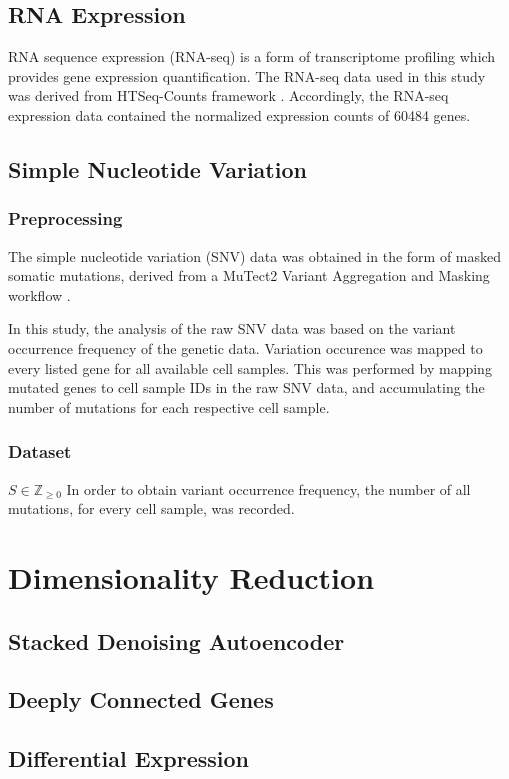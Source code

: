 \subsection{RNA Expression}

RNA sequence expression (RNA-seq) is a form of transcriptome profiling which provides gene expression quantification. The RNA-seq data used in this study was derived from HTSeq-Counts framework \cite{anders2015htseq}. Accordingly, the RNA-seq expression data contained the normalized expression counts of 60484 genes.

\subsection{Simple Nucleotide Variation}

\subsubsection{Preprocessing}

The simple nucleotide variation (SNV) data was obtained in the form of masked somatic mutations, derived from a MuTect2 Variant Aggregation and Masking workflow \cite{cibulskis2013sensitive}. 

In this study, the analysis of the raw SNV data was based on the variant occurrence frequency of the genetic data. Variation occurence was mapped to every listed gene for all available cell samples. This was performed by mapping mutated genes to cell sample IDs in the raw SNV data, and accumulating the number of mutations for each respective cell sample.

\subsubsection{Dataset}

$S \in \mathbb{Z}_{\geq 0}$
In order to obtain variant occurrence frequency, the number of all mutations, for every cell sample, was recorded.

\section{Dimensionality Reduction}

\subsection{Stacked Denoising Autoencoder}

\subsection{Deeply Connected Genes}

\subsection{Differential Expression}